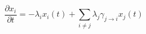 \documentclass{article}
\begin{document}
\pagecolor{black}

{\color{white}
\[
\frac{\partial x_i}{\partial t} = -\lambda_i x_i(t) + \sum_{i\neq j}{\lambda_j \gamma_{j\to i}}x_j(t)
\]
}
\end{document}

